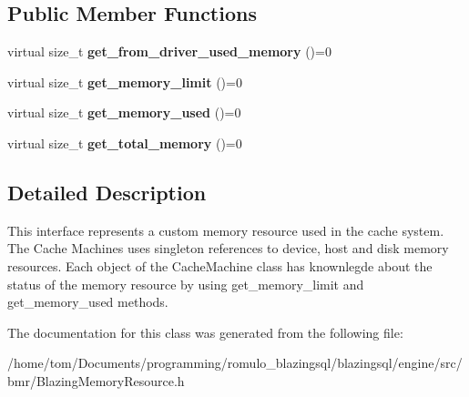 \subsection*{Public Member Functions}
\begin{DoxyCompactItemize}
\item 
\mbox{\label{classBlazingMemoryResource_abd562a80dbab3fd1d174f8e6ec4547f0}} 
virtual size\+\_\+t {\bfseries get\+\_\+from\+\_\+driver\+\_\+used\+\_\+memory} ()=0
\item 
\mbox{\label{classBlazingMemoryResource_a1436e73e3554c721a5a972fcf21bc91f}} 
virtual size\+\_\+t {\bfseries get\+\_\+memory\+\_\+limit} ()=0
\item 
\mbox{\label{classBlazingMemoryResource_a89e616e15446e4bfd013d55b714f1fc9}} 
virtual size\+\_\+t {\bfseries get\+\_\+memory\+\_\+used} ()=0
\item 
\mbox{\label{classBlazingMemoryResource_a5e3c23ce2c2b065bed12f9b29a9976f6}} 
virtual size\+\_\+t {\bfseries get\+\_\+total\+\_\+memory} ()=0
\end{DoxyCompactItemize}


\subsection{Detailed Description}
This interface represents a custom memory resource used in the cache system. The Cache Machines uses singleton references to device, host and disk memory resources. Each object of the Cache\+Machine class has knownlegde about the status of the memory resource by using {\ttfamily get\+\_\+memory\+\_\+limit} and {\ttfamily get\+\_\+memory\+\_\+used} methods. 

The documentation for this class was generated from the following file\+:\begin{DoxyCompactItemize}
\item 
/home/tom/\+Documents/programming/romulo\+\_\+blazingsql/blazingsql/engine/src/bmr/Blazing\+Memory\+Resource.\+h\end{DoxyCompactItemize}
